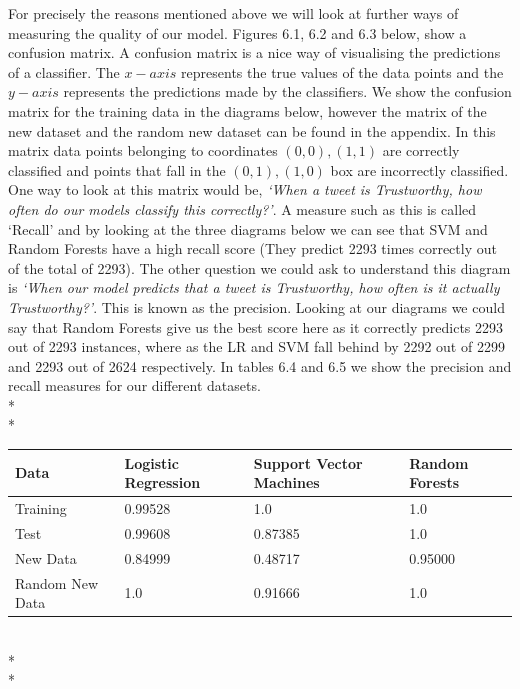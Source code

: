 For precisely the reasons mentioned above we will look at further ways of measuring the quality of our model. Figures 6.1, 6.2 and 6.3 below, show a confusion matrix. A confusion matrix is a nice way of visualising the predictions of a classifier. The $x-axis$ represents the true values of the data points and the $y-axis$ represents the predictions made by the classifiers. We show the confusion matrix for the training data in the diagrams below, however the matrix of the new dataset and the random new dataset can be found in the appendix. In this matrix data points belonging to coordinates $(0,0) , (1,1)$ are correctly classified and points that fall in the $(0,1) , (1,0)$ box are incorrectly classified. One way to look at this matrix would be,\textit{ `When a tweet is Trustworthy, how often do our models classify this correctly?'}. A measure such as this is called `Recall' and by looking at the three diagrams below we can see that SVM and Random Forests have a high recall score (They predict 2293 times correctly out of the total of 2293). The other question we could ask to understand this diagram is \textit{`When our model predicts that a tweet is Trustworthy, how often is it actually Trustworthy?'}. This is known as the precision. Looking at our diagrams we could say that Random Forests give us the best score here as it correctly predicts 2293 out of 2293 instances, where as the LR and SVM fall behind by 2292 out of 2299 and 2293 out of 2624 respectively. In tables 6.4 and 6.5 we show the precision and recall measures for our different datasets.   \\*\\*

\begin{minipage}{\linewidth}
\centering
{} \label{tab:title} 
\begin{tabular}[t]{ C{1.4in} *3{C{1.4in}}}\toprule[1.5pt]
\bf Data & \bf Logistic Regression & \bf Support Vector Machines & \bf Random Forests \\\midrule
Training        &  0.99528  & 1.0 & 1.0\\
Test        &  0.99608     & 0.87385 & 1.0 \\
New Data        &  0.84999   & 0.48717  & 0.95000 \\
Random New Data & 1.0 & 0.91666 & 1.0 \\ 
\bottomrule[1.25pt]
\end {tabular}\par
\bigskip
\end{minipage}\\*\\*

